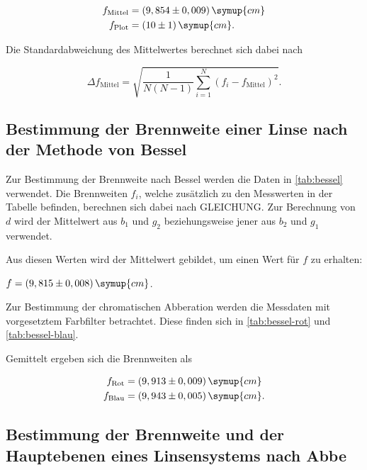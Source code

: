 \begin{align*}
    f_\text{Mittel} &= (9,854 \pm 0,009) \, \symup{cm}\\
    f_\text{Plot} &= (10 \pm 1) \, \symup{cm}.
\end{align*}

Die Standardabweichung des Mittelwertes berechnet sich dabei nach

\begin{equation}
  \label{eqn:mittel}
  \Delta f_\text{Mittel} = \sqrt{ \frac{1}{N(N-1)} \sum^N_{i=1} (f_i - f_\text{Mittel})^2 }.
\end{equation}

\subsection{Bestimmung der Brennweite einer Linse nach der Methode von Bessel}

Zur Bestimmung der Brennweite nach Bessel werden die Daten in \autoref{tab:bessel} verwendet.
Die Brennweiten $f_i$, welche zusätzlich zu den Messwerten in der Tabelle befinden, berechnen sich dabei nach GLEICHUNG.
Zur Berechnung von $d$ wird der Mittelwert aus $b_1$ und $g_2$ beziehungsweise jener aus $b_2$ und $g_1$ verwendet.



Aus diesen Werten wird der Mittelwert gebildet, um einen Wert für $f$ zu erhalten:

\begin{center}
  $f = (9,815 \pm 0,008) \, \symup{cm}$.
\end{center}

Zur Bestimmung der chromatischen Abberation werden die Messdaten mit vorgesetztem Farbfilter betrachtet.
Diese finden sich in \autoref{tab:bessel-rot} und \autoref{tab:bessel-blau}.





Gemittelt ergeben sich die Brennweiten als

\begin{align*}
  f_\text{Rot} &=  (9,913 \pm 0,009) \, \symup{cm}\\
  f_\text{Blau} &= (9,943 \pm 0,005) \, \symup{cm}.
\end{align*}



\subsection{Bestimmung der Brennweite und der Hauptebenen eines Linsensystems nach Abbe}

